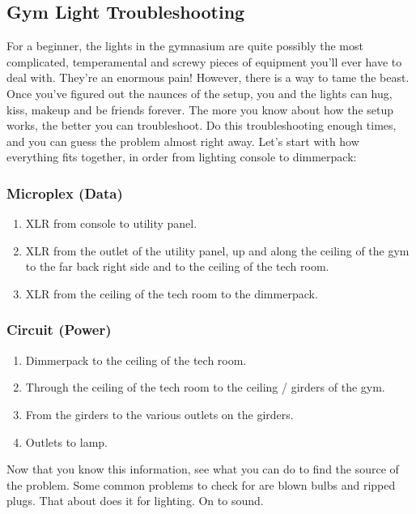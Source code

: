 \documentclass[letterpaper,10pt,oneside,headsepline]{scrreprt}
\begin{document}
\subsection{Gym Light Troubleshooting}
For a beginner, the lights in the gymnasium are quite possibly the most complicated, temperamental and screwy pieces of equipment you'll ever have to deal with. They're an enormous pain! However, there is a way to tame the beast. Once you've figured out the naunces of the setup, you and the lights can hug, kiss, makeup and be friends forever. The more you know about how the setup works, the better you can troubleshoot. Do this troubleshooting enough times, and you can guess the problem almost right away. Let's start with how everything fits together, in order from lighting console to dimmerpack:
\subsubsection{Microplex (Data)}
\begin{enumerate}
\item XLR from console to utility panel.
\item XLR from the outlet of the utility panel, up and along the ceiling of the gym to the far back right side and to the ceiling of the tech room.
\item XLR from the ceiling of the tech room to the dimmerpack.
\end{enumerate}

\subsubsection{Circuit (Power)}
\begin{enumerate}
\item Dimmerpack to the ceiling of the tech room.
\item Through the ceiling of the tech room to the ceiling / girders of the gym.
\item From the girders to the various outlets on the girders.
\item Outlets to lamp.
\end{enumerate}

Now that you know this information, see what you can do to find the source of the problem. Some common problems to check for are blown bulbs and ripped plugs. That about does it for lighting. On to sound.
\end{document}
